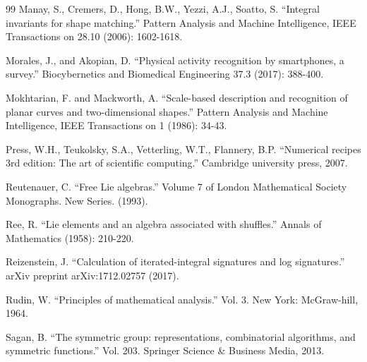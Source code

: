 \documentclass{scrartcl}
\theoremstyle{plain}
\theoremstyle{definition}
\newcommand{\1}[1]{1_{\{#1\}}}
\begin{document}
\begin{thebibliography}{99}
    Manay, S., Cremers, D., Hong, B.W.,  Yezzi, A.J.,  Soatto, S.
    ``Integral invariants for shape matching.'' Pattern Analysis and Machine Intelligence, IEEE Transactions on 28.10 (2006): 1602-1618. 

    Morales, J., and Akopian, D. ``Physical activity recognition by smartphones, a survey.'' Biocybernetics and Biomedical Engineering 37.3 (2017): 388-400.

    Mokhtarian, F. and Mackworth, A. ``Scale-based description and recognition
    of planar curves and two-dimensional shapes.'' Pattern Analysis and Machine
    Intelligence, IEEE Transactions on 1 (1986): 34-43.

     Press, W.H., Teukolsky, S.A., Vetterling, W.T., Flannery, B.P. ``Numerical
     recipes 3rd edition: The art of scientific computing.'' Cambridge
     university press, 2007.


    Reutenauer, C. ``Free Lie algebras.'' Volume 7 of London Mathematical Society Monographs. New Series. (1993).

    Ree, R. ``Lie elements and an algebra associated with shuffles.'' Annals of Mathematics (1958): 210-220.

    Reizenstein, J. ``Calculation of iterated-integral signatures and log signatures.'' arXiv preprint arXiv:1712.02757 (2017).

    Rudin, W. ``Principles of mathematical analysis.'' Vol. 3. New York: McGraw-hill, 1964.

    Sagan, B. ``The symmetric group: representations, combinatorial algorithms, and symmetric functions.'' Vol. 203. Springer Science \& Business Media, 2013.


\end{thebibliography}
\end{document}
